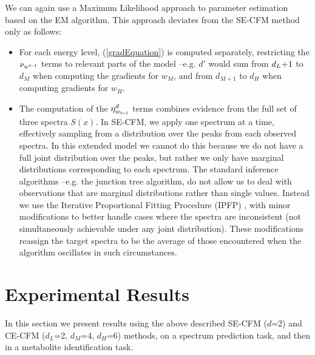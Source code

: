 We can again use a Maximum Likelihood approach to parameter estimation based on the EM algorithm. This approach deviates from the SE-CFM method only as follows:
\begin{itemize}
\item For each energy level, (\ref{gradEquation}) is computed separately, restricting the $\nu_{w^{t\hspace{-1pt}-\hspace{-1pt}1}}$ terms to relevant parts of the model --e.g. $d'$ would sum from $d_{L}\hspace{-2pt}+\hspace{-2pt}1$ to $d_{M}$ when computing the gradients for $w_{M}$, and from $d_{M+1}$ to $d_{H}$ when computing gradients for $w_{H}$.
\item The computation of the $\eta^{d}_{w_{t\hspace{-1pt}-\hspace{-1pt}1}}$ terms combines evidence from the full set of three spectra $S(x)$. In SE-CFM, we apply one spectrum at a time, effectively sampling from a distribution over the peaks from each observed spectra. In this extended model we cannot do this because we do not have a full joint distribution over the peaks, but rather we only have marginal distributions corresponding to each spectrum. 
The standard inference algorithms --e.g. the junction tree algorithm, do not allow us to deal with observations that are marginal distributions rather than single values. Instead we use the Iterative Proportional Fitting Procedure (IPFP) \citep{Stephan1940}, with minor modifications to better handle cases where the spectra are inconsistent (not simultaneously achievable under any joint distribution). These modifications reassign the target spectra to be the average of those encountered when the algorithm oscillates in such circumstances.
\end{itemize}

\section{Experimental Results}
\label{sec:results}

In this section we present results using the above described SE-CFM ($d$=2) and CE-CFM ($d_{L}$=2, $d_{M}$=4, $d_{H}$=6) methods, on a spectrum prediction task, and then in a metabolite identification task. 

